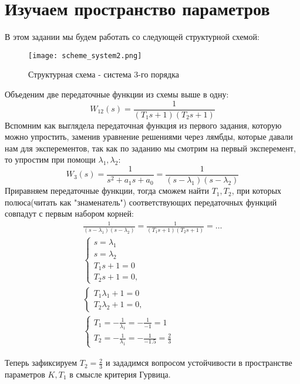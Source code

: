 \section{Изучаем пространство параметров}
В этом задании мы будем работать со следующей структурной схемой:
\begin{figure}[ht]
  \centering
  \texttt{[image: scheme\_system2.png]}
\caption{Структурная схема - система 3-го порядка}
\end{figure}
Объеденим две передаточные функции из схемы выше в одну:
$$
W_{12}(s) = \frac{1}{(T_1s+1)(T_2s+1)}
$$
Вспомним как выглядела передаточная функция из первого задания, которую можно упростить, заменив уравнение решениями через лямбды, которые давали нам для эксперементов, так как по заданию мы смотрим на первый эксперемент, то упростим при помощи $\lambda_1,\lambda_2$:
$$
W_{3}(s) = \frac{1}{s^2 + a_1s + a_0} =\frac{1}{(s-\lambda_1)(s-\lambda_2)}
$$
Приравняем передаточные функции, тогда сможем найти $T_1, T_2$, при которых полюса(читать как "знаменатель") соответствующих передаточных функций совпадут с первым набором корней:
$$
\begin{aligned}
  \frac{1}{(s-\lambda_1)(s-\lambda_2)} = \frac{1}{(T_1s+1)(T_2s+1)} = \dots \\
  \begin{cases}
      s = \lambda_1\\
      s = \lambda_2 \\
      T_1s + 1 = 0 \\
      T_2s + 1 = 0,
   \end{cases} \\
   \begin{cases}
      T_1\lambda_1 + 1 = 0 \\
      T_2\lambda_2 + 1 = 0,
 \end{cases} \\
 \begin{cases}
    T_1 = -\frac{1}{\lambda_1} = -\frac{1}{-1} = 1\\
    T_2 = -\frac{1}{\lambda_1} = -\frac{1}{-1.5} = \frac{2}{3} 
  \end{cases}
\end{aligned}
$$

Теперь зафиксируем $T_2 = \frac{2}{3}$ и зададимся вопросом устойчивости в пространстве параметров $K,T_1$ в смысле критерия Гурвица. 

